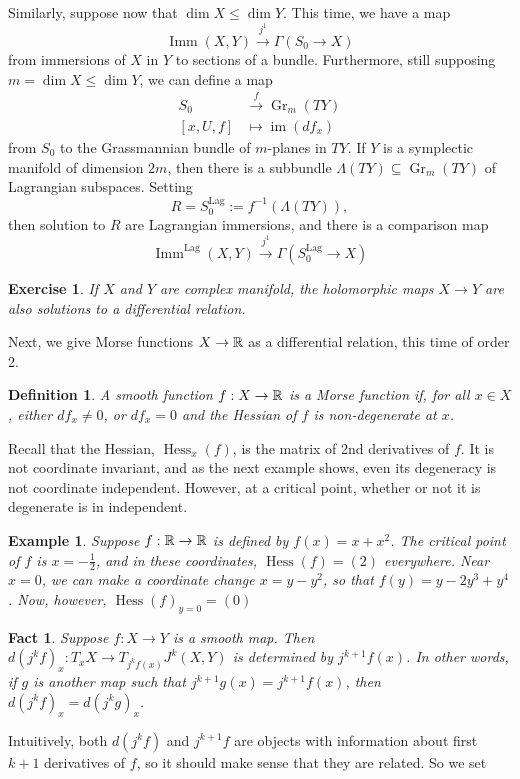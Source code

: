 \documentclass{article}
\newtheorem{fact}[theorem]{Fact}
\newtheorem{definition}[theorem]{Definition}
\newtheorem{example}[theorem]{Example}
\newtheorem{exercise}[theorem]{Exercise}
\newtheorem{proposed work}[theorem]{Proposed Work}
\DeclareMathOperator{\Imm}{Imm}
\DeclareMathOperator{\Gr}{Gr}
\DeclareMathOperator{\image}{im}
\DeclareMathOperator{\Hess}{Hess}
\begin{document}
Similarly, suppose now that $\dim X\le \dim Y$. This time, we have a map
\[\Imm(X,Y)\xrightarrow{j^1}\Gamma(S_0\to X)\]
from immersions of $X$ in $Y$ to sections of a bundle. Furthermore, still supposing $m=\dim X\le \dim Y$, we can define a map
\begin{align*}
  S_0&\xrightarrow{f} \Gr_m(TY)\\
       [x,U,f]&\mapsto \image(df_x)
\end{align*}
from $S_0$ to the Grassmannian bundle of $m$-planes in $TY$. If $Y$ is a symplectic manifold of dimension $2m$, then there is a subbundle $\Lambda(TY)\subseteq \Gr_m(TY)$ of Lagrangian subspaces. Setting
\[
R = S_0^{\text{Lag}}:= f^{-1}(\Lambda(TY)),
\]
then solution to $R$ are Lagrangian immersions, and there is a comparison map
\[
\Imm^\text{Lag}(X,Y)\xrightarrow{j^1}\Gamma(S^\text{Lag}_0\to X)
\]
\begin{exercise}
  If $X$ and $Y$ are complex manifold, the holomorphic maps $X\to Y$ are also solutions to a differential relation.
\end{exercise}
Next, we give Morse functions $X\to \mathbb R$ as a differential relation, this time of order 2.
\begin{definition}
  A smooth function $f: X\to \mathbb R$ is a \textit{Morse function} if, for all $x\in X$, either $df_x\neq 0$, or $df_x=0$ and the Hessian of $f$ is non-degenerate at $x$.
\end{definition}
Recall that the Hessian, $\Hess_x(f)$, is the matrix of 2nd derivatives of $f$. It is not coordinate invariant, and as the next example shows, even its degeneracy is not coordinate independent. However, at a critical point, whether or not it is degenerate is in independent.
\begin{example}
  Suppose $f:\mathbb R \to \mathbb R$ is defined by $f(x)=x+x^2$. The critical point of $f$ is $x=-\frac12$, and in these coordinates, $\Hess(f)=(2)$ everywhere. Near $x=0$, we can make a coordinate change $x=y-y^2$, so that $f(y)=y-2y^3+y^4$. Now, however, $\Hess(f)_{y=0}=(0)$
\end{example}
\begin{fact}
Suppose $f:X\to Y$ is a smooth map. Then $d(j^kf)_x: T_xX\to T_{j^kf(x)}J^k(X,Y)$ is determined by $j^{k+1}f(x)$. In other words, if $g$ is another map such that $j^{k+1}g(x)=j^{k+1}f(x)$, then $d(j^kf)_x=d(j^kg)_x$.
\end{fact}
Intuitively, both $d(j^kf)$ and $j^{k+1}f$ are objects with information about first $k+1$ derivatives of $f$, so it should make sense that they are related. So we set
\end{document}
